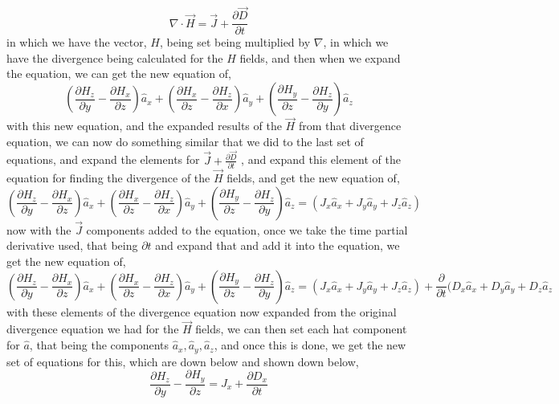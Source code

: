 \documentclass[]{article}
\begin{document}
\[\nabla \cdot \vec{H} = \vec{J} + \frac{\partial{\vec{D}}}{\partial{t}}\]
in which we have the vector, $H$, being set being multiplied by $\nabla$, in which we have the divergence being calculated for the $H$ fields, and then when we expand the equation, we can get the new equation of,
\linebreak
\begin{equation}
(\frac{\partial{H}_z}{\partial{y}} - \frac{\partial{H}_x}{\partial{z}})\hat{a}_x + (\frac{\partial{H}_x}{\partial{z}} - \frac{\partial{H}_z}{\partial{x}})\hat{a}_y + (\frac{\partial{H}_y}{\partial{z}} - \frac{\partial{H}_z}{\partial{y}})\hat{a}_z
\end{equation}
with this new equation, and the expanded results of the $\vec{H}$ from that divergence equation, we can now do something similar that we did to the last set of equations, and expand the elements for $\vec{J} + \frac{\partial{\vec{D}}}{\partial{t}}$ , and expand this element of the equation for finding the divergence of the $\vec{H}$ fields, and get the new equation of,
\begin{equation}
(\frac{\partial{H}_z}{\partial{y}} - \frac{\partial{H}_x}{\partial{z}})\hat{a}_x + (\frac{\partial{H}_x}{\partial{z}} - \frac{\partial{H}_z}{\partial{x}})\hat{a}_y + (\frac{\partial{H}_y}{\partial{z}} - \frac{\partial{H}_z}{\partial{y}})\hat{a}_z = (J_x\hat{a}_x + J_y\hat{a}_y + J_z\hat{a}_z)
\end{equation}
now with the $\vec{J}$ components added to the equation, once we take the time partial derivative used, that being $\partial{t}$ and expand that and add it into the equation, we get the new equation of,
\begin{equation}
(\frac{\partial{H}_z}{\partial{y}} - \frac{\partial{H}_x}{\partial{z}})\hat{a}_x + (\frac{\partial{H}_x}{\partial{z}} - \frac{\partial{H}_z}{\partial{x}})\hat{a}_y + (\frac{\partial{H}_y}{\partial{z}} - \frac{\partial{H}_z}{\partial{y}})\hat{a}_z = (J_x\hat{a}_x + J_y\hat{a}_y + J_z\hat{a}_z) + \frac{\partial}{\partial{t}}(D_x\hat{a}_x+D_y\hat{a}_y+D_z\hat{a}_z
\end{equation}
with these elements of the divergence equation now expanded from the original divergence equation we had for the $\vec{H}$ fields, we can then set each hat component for $\hat{a}$, that being the components $\hat{a}_x,\hat{a}_y,\hat{a}_z$, and once this is done, we get the new set of equations for this, which are down below and shown down below,
\begin{equation}
\frac{\partial{H}_z}{\partial{y}} - \frac{\partial{H}_y}{\partial{z}} = J_x + \frac{\partial{D}_x}{\partial{t}} 
\end{equation}
\end{document}
